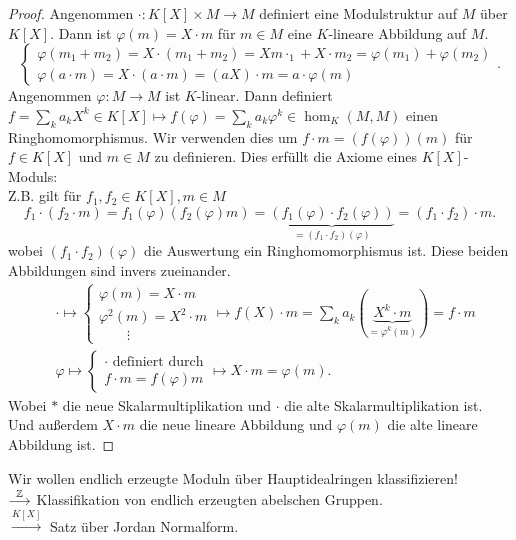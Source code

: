 \begin{proof}
	Angenommen $\cdot : K[X] \times M \to M$ definiert eine Modulstruktur auf $M$ über $K[X]$. Dann ist $\varphi(m) = X \cdot m$ für $m \in M$ eine 
	$K$-lineare Abbildung auf $M$.
	\[
	\begin{cases}
		\varphi(m_1 + m_2) = X \cdot (m_1 + m_2) = X m\cdot _1 + X \cdot m_2 = \varphi(m_1) + \varphi(m_2)\\
		\varphi(a \cdot m) = X \cdot ( a \cdot m) = (a X) \cdot m = a \cdot \varphi(m)
	\end{cases}
	.\] 
	Angenommen $\varphi: M \to M$ ist $K$-linear. Dann definiert $f = \sum_{k} a_{k} X^{k} \in K[X] \mapsto f(\varphi) = \sum_{k} a_{k} \varphi^{k} \in \hom_{K}(M,M)$
	einen Ringhomomorphismus. Wir verwenden dies um $f \cdot m = (f(\varphi))(m)$ für $f \in K[X]$ und $m \in M$ zu definieren.
	Dies erfüllt die Axiome eines $K[X]$-Moduls:\\
	Z.B. gilt für $f_1,f_2 \in K[X], m \in M$
	\[
		f_1 \cdot (f_2 \cdot m) = f_1(\varphi) (f_2(\varphi) m) = \underbrace{(f_1(\varphi) \cdot f_2(\varphi))}_{= (f_1 \cdot f_2)(\varphi)} = (f_1 \cdot f_2) \cdot m
	.\] 
	wobei $(f_1 \cdot f_2)(\varphi)$ die Auswertung ein Ringhomomorphismus ist.
	Diese beiden Abbildungen sind invers zueinander.
	\begin{align*}
		&\cdot \mapsto  \begin{cases}
			\varphi(m) = X \cdot m\\
			\varphi^2(m) = X^2 \cdot m\\
			\qquad \vdots
		\end{cases} \mapsto f(X) \cdot m = \sum_{k} a_{k} ( \underbrace{X^{k} \cdot m}_{= \varphi^{k}(m)}) = f \cdot m\\
		&\varphi \mapsto \begin{cases}
			\cdot \text{ definiert durch}\\
			f \cdot m = f(\varphi) m
		\end{cases} \mapsto X \cdot m = \varphi(m)
	.\end{align*}
	Wobei $*$ die neue Skalarmultiplikation und $\cdot $ die alte Skalarmultiplikation ist.
	Und außerdem $X\cdot m$ die neue lineare Abbildung und $\varphi(m)$ die alte lineare Abbildung ist.
\end{proof}

Wir wollen endlich erzeugte Moduln über Hauptidealringen klassifizieren!\\
$\overset{\mathbb{Z}}{\longrightarrow}$ Klassifikation von endlich erzeugten abelschen Gruppen.\\
$\overset{K[X]}{\longrightarrow}$ Satz über Jordan Normalform.

